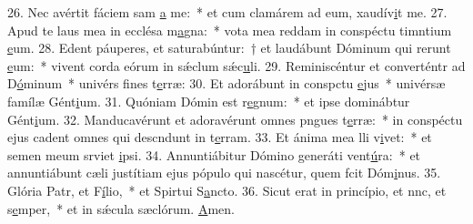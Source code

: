 26. Nec avértit fáciem sam \uline{a} me:~* et cum clamárem ad eum, xaudív\uline{i}t me.
27. Apud te laus mea in ecclésa m\uline{a}gna:~* vota mea reddam in conspéctu timntium \uline{e}um.
28. Edent páuperes, et saturabúntur:~† et laudábunt Dóminum qui rerunt \uline{e}um:~* vivent corda eórum in sǽclum sǽc\uline{u}li.
29. Reminiscéntur et converténtr ad D\uline{ó}minum~* univérs fines t\uline{e}rræ:
30. Et adorábunt in conspctu \uline{e}jus~* univérsæ famílæ Gént\uline{i}um.
31. Quóniam Dómin est r\uline{e}gnum:~* et ipse dominábtur Gént\uline{i}um.
32. Manducavérunt et adoravérunt omnes pngues t\uline{e}rræ:~* in conspéctu ejus cadent omnes qui descndunt in t\uline{e}rram.
33. Et ánima mea lli v\uline{i}vet:~* et semen meum srviet \uline{i}psi.
34. Annuntiábitur Dómino generáti vent\uline{ú}ra:~* et annuntiábunt cæli justítiam ejus pópulo qui nascétur, quem fcit Dóm\uline{i}nus.
35. Glória Patr, et F\uline{í}lio,~* et Spirtui S\uline{a}ncto.
36. Sicut erat in princípio, et nnc, et s\uline{e}mper,~* et in sǽcula sæclórum. \uline{A}men.
